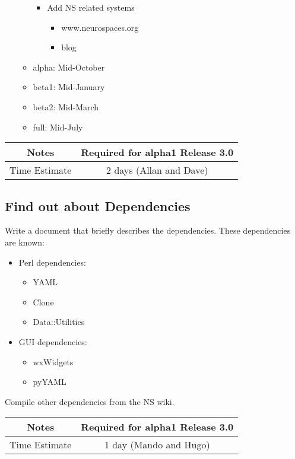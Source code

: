 \documentclass[12pt]{article}
\begin{document}
\begin{itemize}
\begin{itemize}
\begin{itemize}
    \item Add NS related systems
      \begin{itemize}
      \item www.neurospaces.org
      \item blog
      \end{itemize}
    \end{itemize}
  \item alpha: Mid-October
  \item beta1: Mid-January
  \item beta2: Mid-March
  \item full: Mid-July
  \end{itemize}
\end{itemize}

{
  \vspace{5mm}
  \centering
  \begin{tabular}{|c|c|}
    \hline
    Notes
    & Required for alpha1 Release 3.0 \\
    \hline
    Time Estimate
    & 2 days (Allan and Dave) \\
    \hline
  \end{tabular}
}


\subsection{Find out about Dependencies}

Write a document that briefly describes the dependencies.  These
dependencies are known:
\begin{itemize}
\item Perl dependencies:
  \begin{itemize}
  \item YAML
  \item Clone
  \item Data::Utilities
  \end{itemize}
\item GUI dependencies:
  \begin{itemize}
  \item wxWidgets
  \item pyYAML
  \end{itemize}
\end{itemize}

Compile other dependencies from the NS wiki.

{
  \vspace{5mm}
  \centering
  \begin{tabular}{|c|c|}
    \hline
    Notes
    & Required for alpha1 Release 3.0 \\
    \hline
    Time Estimate
    & 1 day (Mando and Hugo) \\
    \hline
  \end{tabular}
}
\end{document}
